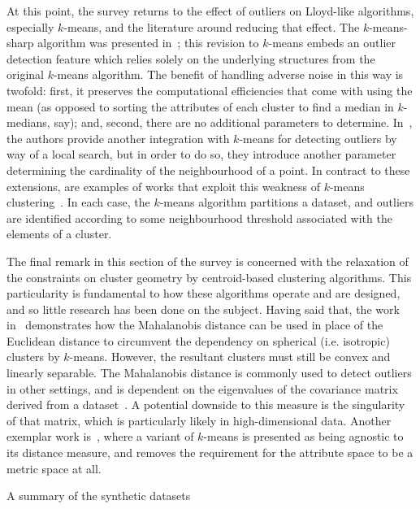 At this point, the survey returns to the effect of outliers on Lloyd-like
algorithms, especially \(k\)-means, and the literature around reducing that
effect. The \(k\)-means-sharp algorithm was presented in~\cite{Olukanmi2017};
this revision to \(k\)-means embeds an outlier detection feature which relies
solely on the underlying structures from the original \(k\)-means algorithm. The
benefit of handling adverse noise in this way is twofold: first, it preserves
the computational efficiencies that come with using the mean (as opposed to
sorting the attributes of each cluster to find a median in \(k\)-medians, say);
and, second, there are no additional parameters to determine.
In~\cite{Gupta2017}, the authors provide another integration with \(k\)-means
for detecting outliers by way of a local search, but in order to do so, they
introduce another parameter determining the cardinality of the neighbourhood of
a point. In contract to these extensions, are examples of works that exploit
this weakness of \(k\)-means clustering~\cite{Lei2012,Wei2019}. In each case,
the \(k\)-means algorithm partitions a dataset, and outliers are identified
according to some neighbourhood threshold associated with the elements of a
cluster.

The final remark in this section of the survey is concerned with the relaxation
of the constraints on cluster geometry by centroid-based clustering algorithms.
This particularity is fundamental to how these algorithms operate and are
designed, and so little research has been done on the subject. Having said that,
the work in~\cite{Sung1998} demonstrates how the Mahalanobis distance can be
used in place of the Euclidean distance to circumvent the dependency on
spherical (i.e.  isotropic) clusters by \(k\)-means. However, the resultant
clusters must still be convex and linearly separable. The Mahalanobis distance
is commonly used to detect outliers in other settings, and is dependent on the
eigenvalues of the covariance matrix derived from a
dataset~\cite{Mahalanobis1936}. A potential downside to this measure is the
singularity of that matrix, which is particularly likely in high-dimensional
data. Another exemplar work is~\cite{Statman2020}, where a variant of
\(k\)-means is presented as being agnostic to its distance measure, and removes
the requirement for the attribute space to be a metric space at all.

\begin{table}
    
    \caption{A summary of the synthetic datasets}\label{tab:datasets}
\end{table}

